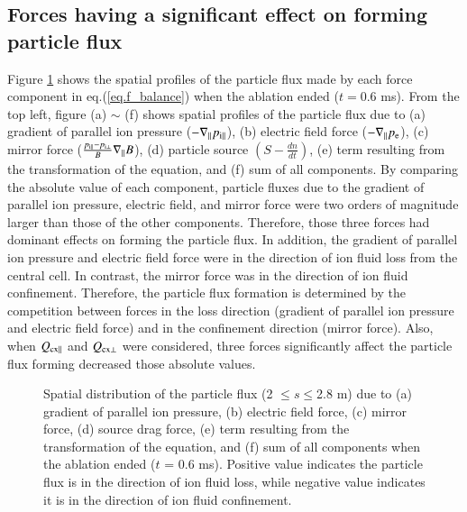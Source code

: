 \documentclass{jasse}%
\begin{document}
\subsection{Forces having a significant effect on forming particle flux}
Figure \ref{fig_dist_particle_flux} shows the spatial profiles of the particle flux made by each force component in eq.(\ref{eq.f_balance}) when the ablation ended ($t = 0.6$ ms). From the top left, figure (a) $\sim$ (f) shows spatial profiles of the particle flux due to (a) gradient of parallel ion pressure ($-\nabla_{\parallel} p_{\rm{i}\parallel}$), (b) electric field force ($-\nabla_{\parallel} p_{\rm{e}}$), (c) mirror force ($\frac{p_{\rm{i}\parallel}-p_{\rm{i}\bot}}{B}\nabla_{\parallel} B$), (d) particle source $\left(S - \frac{d n}{d t}\right)$, (e) term resulting from the transformation of the equation, and (f) sum of all components.
By comparing the absolute value of each component, particle fluxes due to the gradient of parallel ion pressure, electric field, and mirror force were two orders of magnitude larger than those of the other components. Therefore, those three forces had dominant effects on forming the particle flux. In addition, the gradient of parallel ion pressure and electric field force were in the direction of ion fluid loss from the central cell. In contrast, the mirror force was in the direction of ion fluid confinement. Therefore, the particle flux formation is determined by the competition between forces in the loss direction (gradient of parallel ion pressure and electric field force) and in the confinement direction (mirror force). Also, when $Q_{\rm{cx\parallel}}$ and $Q_{\rm{cx\bot}}$ were considered, three forces significantly affect the particle flux forming decreased those absolute values. 
\begin{figure}[t]
    \centering
    
    \caption{Spatial distribution of the particle flux (2 $\leq s \leq $2.8 m) due to (a) gradient of parallel ion pressure, (b) electric field force, (c) mirror force, (d) source drag force, (e) term resulting from the transformation of the equation, and (f) sum of all components when the ablation ended ($t$ = 0.6 ms). Positive value indicates the particle flux is in the direction of ion fluid loss, while negative value indicates it is in the direction of ion fluid confinement.} \label{fig_dist_particle_flux}
\end{figure}
\end{document}
